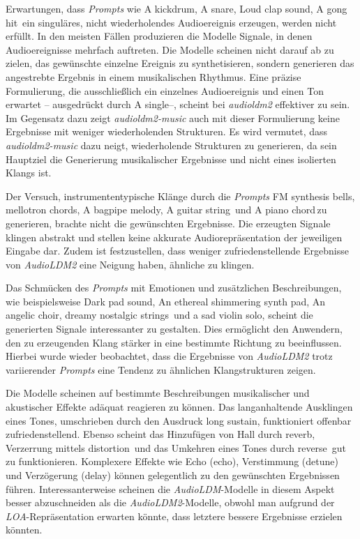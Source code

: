 \documentclass[
  a4paper,  %
  twoside,  %
  bibliography=totoc,
  headsepline,
  cleardoublepage=empty,
  parskip=half,
  draft=false
]{scrbook}
\begin{document}
Erwartungen, dass \emph{Prompts} wie \glqq A kickdrum\grqq, \glqq A snare\grqq, \glqq Loud clap sound\grqq, \glqq A gong hit\grqq \, ein singuläres, nicht wiederholendes Audioereignis erzeugen, werden nicht erfüllt. In den meisten Fällen produzieren die Modelle Signale, in denen Audioereignisse mehrfach auftreten. Die Modelle scheinen nicht darauf ab zu zielen, das gewünschte einzelne Ereignis zu synthetisieren, sondern generieren das angestrebte Ergebnis in einem musikalischen Rhythmus. Eine präzise Formulierung, die ausschließlich ein einzelnes Audioereignis und einen Ton erwartet – ausgedrückt durch \glqq A single\grqq –, scheint bei \emph{audioldm2} \cite{noauthor_cvsspaudioldm2_nodate} effektiver zu sein. Im Gegensatz dazu zeigt \emph{audioldm2-music} \cite{noauthor_cvsspaudioldm2-music_nodate} auch mit dieser Formulierung keine Ergebnisse mit weniger wiederholenden Strukturen. Es wird vermutet, dass \emph{audioldm2-music} \cite{noauthor_cvsspaudioldm2-music_nodate} dazu neigt, wiederholende Strukturen zu generieren, da sein Hauptziel die Generierung musikalischer Ergebnisse und nicht eines isolierten Klangs ist.

Der Versuch, instrumententypische Klänge durch die \emph{Prompts} \glqq FM synthesis bells\grqq, \glqq mellotron chords\grqq, \glqq A bagpipe melody\grqq, \glqq A guitar string\grqq \, und \glqq A piano chord\grqq \,zu generieren, brachte nicht die gewünschten Ergebnisse. Die erzeugten Signale klingen abstrakt und stellen keine akkurate Audiorepräsentation der jeweiligen Eingabe dar. Zudem ist festzustellen, dass weniger zufriedenstellende Ergebnisse von \emph{AudioLDM2} eine Neigung haben, ähnliche zu klingen.

Das Schmücken des \emph{Prompts} mit Emotionen und zusätzlichen Beschreibungen, wie beispielsweise \glqq Dark pad sound\grqq, \glqq An ethereal shimmering synth pad\grqq, \glqq An angelic choir\grqq, \glqq dreamy nostalgic strings\grqq \, und \glqq a sad violin solo\grqq, scheint die generierten Signale interessanter zu gestalten. Dies ermöglicht den Anwendern, den zu erzeugenden Klang stärker in eine bestimmte Richtung zu beeinflussen. Hierbei wurde wieder beobachtet, dass die Ergebnisse von \emph{AudioLDM2} trotz variierender \emph{Prompts} eine Tendenz zu ähnlichen Klangstrukturen zeigen.

Die Modelle scheinen auf bestimmte Beschreibungen musikalischer und akustischer Effekte adäquat reagieren zu können. Das langanhaltende Ausklingen eines Tones, umschrieben durch den Ausdruck \glqq long sustain\grqq, funktioniert offenbar zufriedenstellend. Ebenso scheint das Hinzufügen von Hall durch \glqq reverb\grqq, Verzerrung mittels \glqq distortion\grqq \, und das Umkehren eines Tones durch \glqq reverse\grqq \, gut zu funktionieren. Komplexere Effekte wie Echo (\glqq echo\grqq), Verstimmung (\glqq detune\grqq) und Verzögerung (\glqq delay\grqq) können gelegentlich zu den gewünschten Ergebnissen führen. Interessanterweise scheinen die \emph{AudioLDM}-Modelle in diesem Aspekt besser abzuschneiden als die \emph{AudioLDM2}-Modelle, obwohl man aufgrund der \emph{LOA}-Repräsentation erwarten könnte, dass letztere bessere Ergebnisse erzielen könnten.
\end{document}
